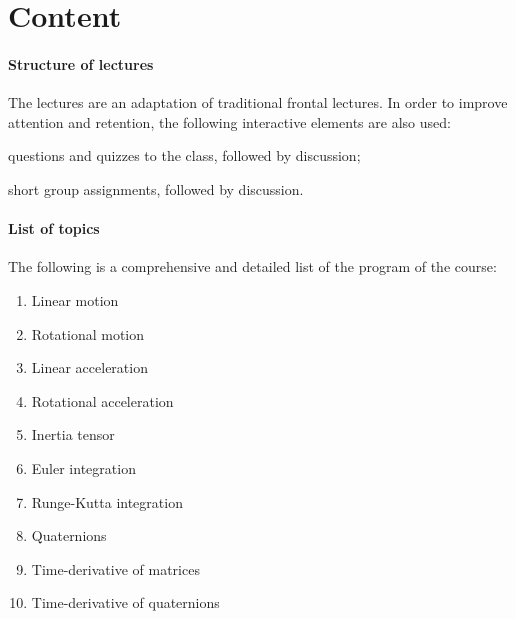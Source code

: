 \section{Content}
	\paragraph*{Structure of lectures}
	The lectures are an adaptation of traditional frontal lectures. In order to improve attention and retention, the following interactive elements are also used:
	\begin{inparaenum}
	\item questions and quizzes to the class, followed by discussion;
	\item short group assignments, followed by discussion.
	\end{inparaenum}
	

	\paragraph*{List of topics}
	 	The following is a comprehensive and detailed list of the program of the course:
 		\begin{enumerate}
			\item Linear motion
			\item Rotational motion
			\item Linear acceleration
			\item Rotational acceleration
			\item Inertia tensor
			\item Euler integration
			\item Runge-Kutta integration
			\item Quaternions
			\item Time-derivative of matrices
			\item Time-derivative of quaternions
		\end{enumerate}
\ \\

